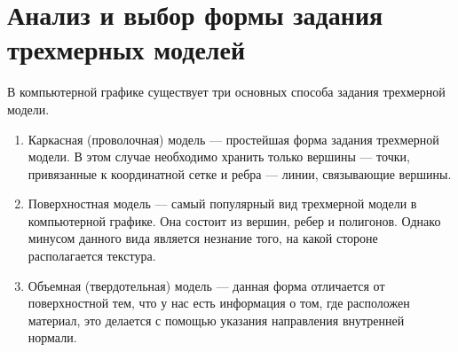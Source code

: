 \section{Анализ и выбор формы задания трехмерных моделей}
В компьютерной графике существует три основных способа задания трехмерной модели.
\begin{enumerate}
	\item Каркасная (проволочная) модель --- простейшая форма задания трехмерной модели. В этом случае необходимо хранить только вершины --- точки, привязанные к координатной сетке и ребра --- линии, связывающие вершины.
	
	\item Поверхностная модель --- самый популярный вид трехмерной модели в компьютерной графике. Она состоит из вершин, ребер и полигонов. Однако минусом данного вида является незнание того, на какой стороне располагается текстура.\newpage
	\item Объемная (твердотельная) модель --- данная форма отличается от поверхностной тем, что у нас есть информация о том, где расположен материал, это делается с помощью указания направления внутренней нормали. 
\end{enumerate}

